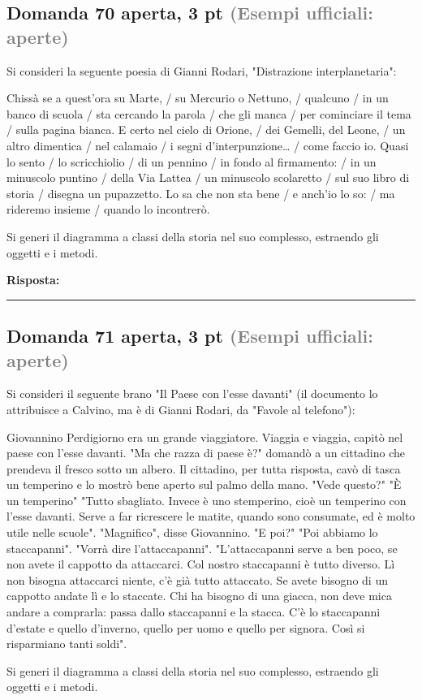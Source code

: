 \documentclass[a4paper,11pt]{article}
\begin{document}
\subsection*{Domanda 70 \hfill {\small aperta, 3 pt \textcolor{gray}{(Esempi ufficiali: aperte)}}}
\begin{tcolorbox}[colback=gray!8,colframe=gray!50,title=Contesto]
Si consideri la seguente poesia di Gianni Rodari, "Distrazione interplanetaria":

Chissà se a quest'ora su Marte, / su Mercurio o Nettuno, / qualcuno / in un banco di scuola / sta cercando la parola / che gli manca / per cominciare il tema / sulla pagina bianca.
E certo nel cielo di Orione, / dei Gemelli, del Leone, / un altro dimentica / nel calamaio / i segni d'interpunzione… / come faccio io.
Quasi lo sento / lo scricchiolio / di un pennino / in fondo al firmamento: / in un minuscolo puntino / della Via Lattea / un minuscolo scolaretto / sul suo libro di storia / disegna un pupazzetto.
Lo sa che non sta bene / e anch'io lo so: / ma rideremo insieme / quando lo incontrerò.
\end{tcolorbox}
Si generi il diagramma a classi della storia nel suo complesso, estraendo gli oggetti e i metodi.

\vspace{0.2cm}
\noindent\textbf{Risposta:}\par
\vspace{4cm}\hrule


\subsection*{Domanda 71 \hfill {\small aperta, 3 pt \textcolor{gray}{(Esempi ufficiali: aperte)}}}
\begin{tcolorbox}[colback=gray!8,colframe=gray!50,title=Contesto]
Si consideri il seguente brano "Il Paese con l'esse davanti" (il documento lo attribuisce a Calvino, ma è di Gianni Rodari, da "Favole al telefono"):

Giovannino Perdigiorno era un grande viaggiatore. Viaggia e viaggia, capitò nel paese con l'esse davanti.
"Ma che razza di paese è?" domandò a un cittadino che prendeva il fresco sotto un albero. Il cittadino, per tutta risposta, cavò di tasca un temperino e lo mostrò bene aperto sul palmo della mano. "Vede questo?" "È un temperino" "Tutto sbagliato. Invece è uno stemperino, cioè un temperino con l'esse davanti. Serve a far ricrescere le matite, quando sono consumate, ed è molto utile nelle scuole". "Magnifico", disse Giovannino. "E poi?" "Poi abbiamo lo staccapanni". "Vorrà dire l'attaccapanni". "L'attaccapanni serve a ben poco, se non avete il cappotto da attaccarci. Col nostro staccapanni è tutto diverso. Lì non bisogna attaccarci niente, c'è già tutto attaccato. Se avete bisogno di un cappotto andate lì e lo staccate. Chi ha bisogno di una giacca, non deve mica andare a comprarla: passa dallo staccapanni e la stacca. C'è lo staccapanni d'estate e quello d'inverno, quello per uomo e quello per signora. Così si risparmiano tanti soldi".
\end{tcolorbox}
Si generi il diagramma a classi della storia nel suo complesso, estraendo gli oggetti e i metodi.
\end{document}
